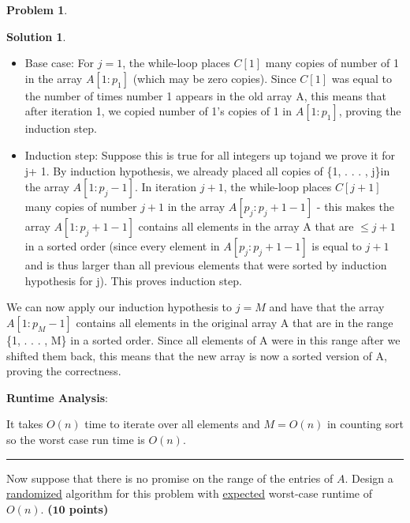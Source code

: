 \documentclass{article}
\theoremstyle{definition}
\newtheorem{problem}{Problem}
\def\fline{\rule{0.75\linewidth}{0.5pt}}
\newcommand{\finishline}{\begin{center}\fline\end{center}}
\newtheorem*{solution*}{Solution}
\newenvironment{solution}{\begin{solution*}}{{\finishline} \end{solution*}}
\newcommand{\grade}[1]{\hfill{\textbf{($\mathbf{#1}$ points)}}}
\begin{document}
\begin{problem}
\begin{enumerate}
\begin{solution}
	\begin{itemize}
	\item Base case: For $j= 1$, the while-loop places $C[1]$ many copies of number of 1 in the array $A[1 : p_1]$ (which may be zero copies).  Since $C[1]$ was equal to the number of times number 1 appears in the old array A, this means that after iteration 1, we copied number of 1's copies of 1 in $A[1 : p_1]$, proving the induction step.
	\item Induction step: Suppose this is true for all integers up tojand we prove it for j+ 1.  By induction hypothesis, we already placed all copies of \{1, . . . , j\}in the array $A[1 :p_j - 1]$.  In iteration $j+ 1$, the while-loop places $C[j + 1]$ many copies of number $j + 1$ in the array $A[p_j : p_j + 1 - 1]$ - this makes the array $A[1 : p_j + 1 - 1]$ contains all elements in the array A that are $\leq j + 1$ in a sorted order (since every element in $A[p_j : p_j + 1 - 1]$ is equal to $j+ 1$ and is thus larger than all previous elements that were sorted by induction hypothesis for j).  This proves induction step.
 	\end{itemize}

	\item We can now apply our induction hypothesis to $j=M$ and have that the array $A[1 : p_M - 1]$ contains all elements in the original array A that are in the range \{1, . . . , M\} in a sorted order.  Since all elements of A were in this range after we shifted them back, this means that the new array is now a sorted version of A, proving the correctness.

	\item\textbf{Runtime Analysis}:
	\item It takes $O(n)$ time to iterate over all elements and $M=O(n)$ in counting sort so the worst case run time is $O(n)$.
	\end{solution}
	
\item[(b)] Now suppose that there is no promise on the range of the entries of $A$. Design a \underline{randomized} algorithm for this problem with \underline{expected} worst-case runtime of $O(n)$. \grade{10}



\end{enumerate}
\end{problem}
\end{document}
